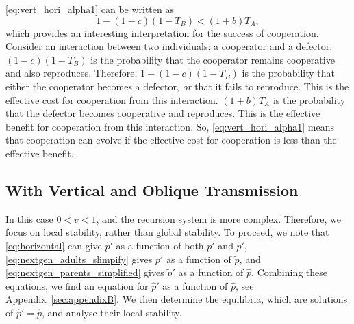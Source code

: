 \documentclass[12pt]{extarticle}
\begin{document}
{\autoref{eq:vert_hori_alpha1} can be written as
\begin{equation} \label{eq:vert_hori_alpha1_effective}
1 - (1-c)(1-T_B) < (1+b) T_A ,
\end{equation}
which provides an interesting interpretation for the success of cooperation. 
Consider an interaction between two individuals: a cooperator and a defector.
$(1-c)(1-T_B)$ is the probability that the cooperator remains cooperative and also reproduces. 
Therefore, $1 - (1-c)(1-T_B)$ is the probability that either the cooperator becomes a defector, \emph{or} that it fails to reproduce.
This is the effective cost for cooperation from this interaction.
$(1+b) T_A$ is the probability that the defector becomes cooperative and reproduces.
This is the effective benefit for cooperation from this interaction.
So, \autoref{eq:vert_hori_alpha1} means that cooperation can evolve if the effective cost for cooperation is less than the effective benefit.



\subsection*{With Vertical and Oblique Transmission}

In this case $0<v<1$, and the recursion system is more complex.
Therefore, we focus on local stability, rather than global stability.
To proceed, we note that 
\autoref{eq:horizontal} can give $\hat{p}'$ as a function of both $p'$ and $\tilde{p}'$,
\autoref{eq:nextgen_adults_slimpify} gives $p'$ as a function of $\tilde{p}$, and 
\autoref{eq:nextgen_parents_simplified} gives $\tilde{p}'$ as a function of $\hat{p}$. 
Combining these equations, we find an equation for $\hat{p}'$ as a function of $\hat{p}$, see Appendix~\autoref{sec:appendixB}.
We then determine the equilibria, which are solutions of $\hat{p}' = \hat{p}$, and analyse their local stability.

}
\end{document}

